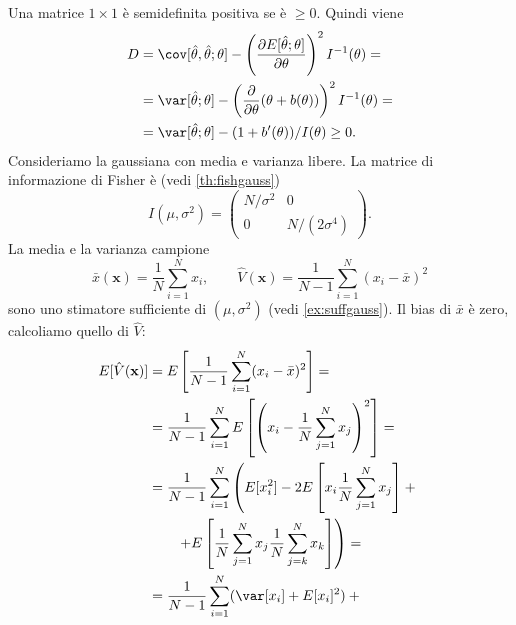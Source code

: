 \begin{solution}
    Una matrice $1\times1$ è semidefinita positiva se è $\ge 0$. Quindi viene
    \begin{align*}
        D &= \cov[\hat\theta,\hat\theta;\theta] -
        \left(\frac{\partial E[\hat\theta;\theta]}{\partial\theta}\right)^2
        I^{-1}(\theta) = \\
        &= \var[\hat\theta;\theta] -
        \left(\frac{\partial}{\partial\theta}(\theta + b(\theta))\right)^2
        I^{-1}(\theta) = \\
        &= \var[\hat\theta;\theta] - (1 + b'(\theta))/I(\theta) \ge 0.
    \end{align*}
    Consideriamo la gaussiana con media e varianza libere. La matrice di
    informazione di Fisher è (vedi \autoref{th:fishgauss})
    \begin{equation*}
        I(\mu,\sigma^2) = \begin{pmatrix}
            N/\sigma^2 & 0 \\
            0 & N/(2\sigma^4)
        \end{pmatrix}.
    \end{equation*}
    La media e la varianza campione
    \begin{equation*}
        \bar x(\mathbf x) = \frac 1N \sum_{i=1}^N x_i, \qquad
        \hat V(\mathbf x) = \frac 1{N-1} \sum_{i=1}^N (x_i - \bar x)^2
    \end{equation*}
    sono uno stimatore sufficiente di $(\mu,\sigma^2)$ (vedi
    \autoref{ex:suffgauss}). Il bias di $\bar x$ è zero, calcoliamo quello di
    $\hat V$:
    \begin{align*}
        E[\hat V(\mathbf x)]
        &= E\left[ \frac 1{N-1} \sum_{i=1}^N (x_i - \bar x)^2 \right] = \\
        &= \frac 1{N-1} \sum_{i=1}^N
        E\left[\left(x_i - \frac1N \sum_{j=1}^N x_j\right)^2\right] = \\
        &= \frac 1{N-1} \sum_{i=1}^N \left(
        E[x_i^2]
        - 2 E\left[ x_i \frac1N \sum_{j=1}^N x_j \right] + {}\right. \\
        &\qquad\left.
        + E\left[ \frac1N \sum_{j=1}^N x_j \frac1N \sum_{j=k}^N x_k \right]
        \right) = \\
        &= \frac1{N-1} \sum_{i=1}^N (\var[x_i] + E[x_i]^2) + {} \\

\end{align*}
\end{solution}
